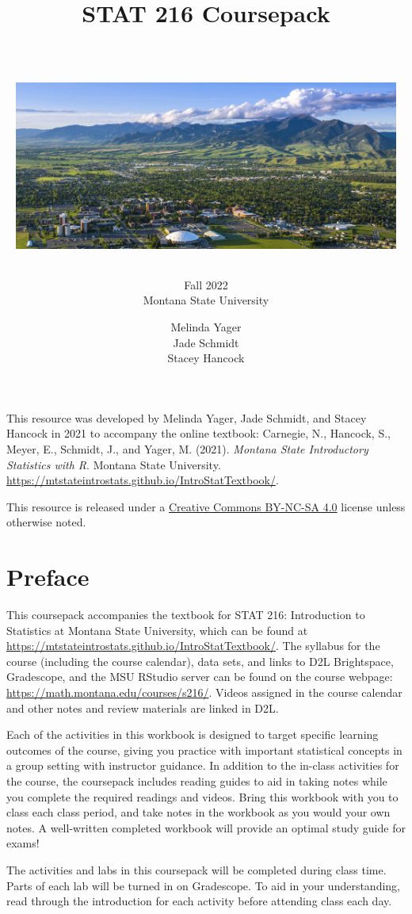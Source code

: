 \documentclass[
]{report}
\title{\textbf{STAT 216 Coursepack}\\
\strut \\
\includegraphics[width=5in,height=\textheight]{images/msu-campus.jpg}}
\subtitle{Fall 2022\\
Montana State University}
\author{Melinda Yager\\
Jade Schmidt\\
Stacey Hancock}
\date{}
\begin{document}
\maketitle

\newpage
\thispagestyle{empty}

This resource was developed by Melinda Yager, Jade Schmidt, and Stacey Hancock in 2021 to accompany the online textbook: Carnegie, N., Hancock, S., Meyer, E., Schmidt, J., and Yager, M. (2021). \emph{Montana State Introductory Statistics with R}. Montana State University. \url{https://mtstateintrostats.github.io/IntroStatTextbook/}.

This resource is released under a \href{https://creativecommons.org/licenses/by-nc-sa/4.0/}{Creative Commons BY-NC-SA 4.0} license unless otherwise noted.

\setcounter{tocdepth}{1}
\tableofcontents
\thispagestyle{empty}

\newpage
\setcounter{page}{1}

\hypertarget{preface}{%
\chapter*{Preface}\label{preface}}

This coursepack accompanies the textbook for STAT 216: Introduction to Statistics at Montana State University, which can be found at \url{https://mtstateintrostats.github.io/IntroStatTextbook/}. The syllabus for the course (including the course calendar), data sets, and links to D2L Brightspace, Gradescope, and the MSU RStudio server can be found on the course webpage: \url{https://math.montana.edu/courses/s216/}.
Videos assigned in the course calendar and other notes and review materials are linked in D2L.

Each of the activities in this workbook is designed to target specific learning outcomes of the course, giving you practice with important statistical concepts in a group setting with instructor guidance. In addition to the in-class activities for the course, the coursepack includes reading guides to aid in taking notes while you complete the required readings and videos. Bring this workbook with you to class each class period, and take notes in the workbook as you would your own notes. A well-written completed workbook will provide an optimal study guide for exams!

The activities and labs in this coursepack will be completed during class time. Parts of each lab will be turned in on Gradescope. To aid in your understanding, read through the introduction for each activity before attending class each day.
\end{document}
